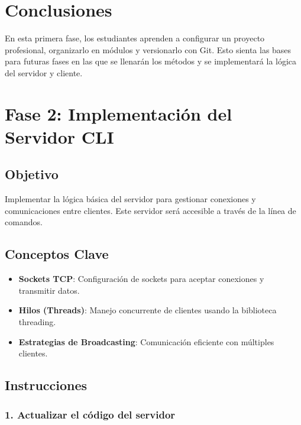 \documentclass[
  a4paper,
  DIV=11,
  numbers=noendperiod,
  onepage,
  openany]{scrreprt}
\begin{document}
\chapter{Conclusiones}\label{conclusiones-14}

En esta primera fase, los estudiantes aprenden a configurar un proyecto
profesional, organizarlo en módulos y versionarlo con Git. Esto sienta
las bases para futuras fases en las que se llenarán los métodos y se
implementará la lógica del servidor y cliente.

\chapter{Fase 2: Implementación del Servidor
CLI}\label{fase-2-implementaciuxf3n-del-servidor-cli}

\section{Objetivo}\label{objetivo-2}

Implementar la lógica básica del servidor para gestionar conexiones y
comunicaciones entre clientes. Este servidor será accesible a través de
la línea de comandos.

\section{Conceptos Clave}\label{conceptos-clave-16}

\begin{itemize}
\item
  \textbf{Sockets TCP}: Configuración de sockets para aceptar conexiones
  y transmitir datos.
\item
  \textbf{Hilos (Threads)}: Manejo concurrente de clientes usando la
  biblioteca threading.
\item
  \textbf{Estrategias de Broadcasting}: Comunicación eficiente con
  múltiples clientes.
\end{itemize}

\section{Instrucciones}\label{instrucciones-12}

\subsection{1. Actualizar el código del
servidor}\label{actualizar-el-cuxf3digo-del-servidor}
\end{document}
